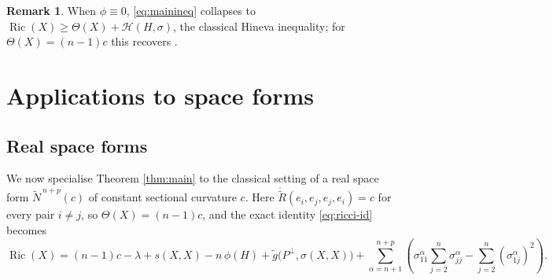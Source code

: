 \documentclass[11pt]{article}
\theoremstyle{definition}
\newtheorem{remark}[theorem]{Remark}
\newcommand{\tN}{\widetilde{N}}
\newcommand{\tg}{\widetilde{g}}
\newcommand{\ctR}{\mathring{\widetilde{R}}}
\newcommand{\Ric}{\operatorname{Ric}}
\newcommand{\HH}{\mathcal{H}}
\begin{document}
\begin{remark}\label{rem:phizero}
When $\phi\equiv0$, \eqref{eq:mainineq} collapses to $\Ric(X)\ge\Theta(X)+\HH(H,\sigma)$, the classical Hineva inequality; for $\Theta(X)=(n-1)c$ this recovers \cite{Hineva3,Verma1}.
\end{remark}

\section{Applications to space forms}\label{sec:app}

\subsection{Real space forms}

We now specialise Theorem \ref{thm:main} to the classical setting of a real space form $\tN^{\,n+p}(c)$ of constant sectional curvature $c$. Here $\ctR(e_i,e_j,e_j,e_i)=c$ for every pair $i\neq j$, so $\Theta(X)=(n-1)c$, and the exact identity \eqref{eq:ricci-id} becomes
\begin{equation}\label{eq:rsf-id}
\Ric(X)=(n-1)c-\lambda+s(X,X)-n\,\phi(H)+\tg\bigl(P^\perp,\sigma(X,X)\bigr)+\sum_{\alpha=n+1}^{n+p}\left(\sigma^\alpha_{11}\sum_{j=2}^{n}\sigma^\alpha_{jj}-\sum_{j=2}^{n}(\sigma^\alpha_{1j})^2\right).
\end{equation}
\end{document}
